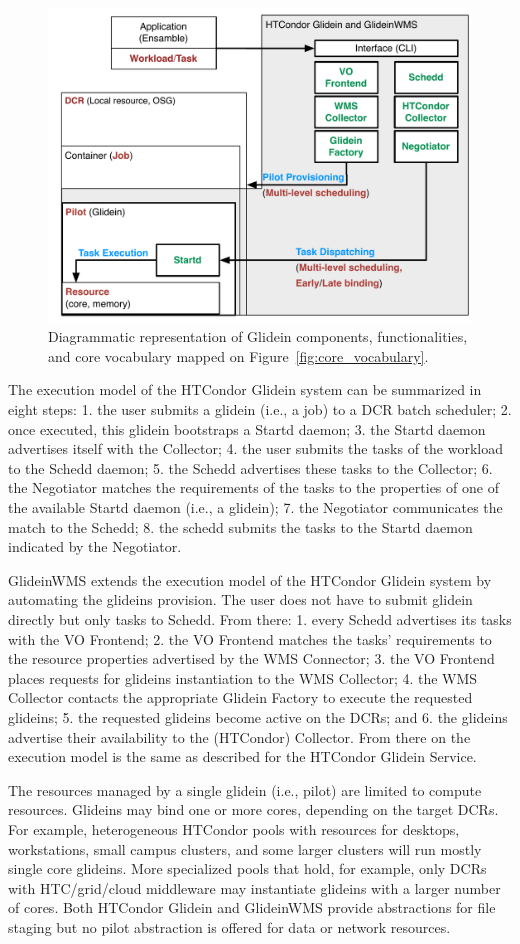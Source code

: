 \documentclass{sig-alternate}
\begin{document}
\begin{figure}[t]
    \centering
        \includegraphics[width=.48\textwidth]{figures/glidein_comparison.pdf}
        \caption{Diagrammatic representation of Glidein components,
          functionalities, and core vocabulary mapped on
          Figure~\ref{fig:core_vocabulary}.}
    \label{fig:glidein_comparison}
\end{figure}

The execution model of the HTCondor Glidein system can be summarized in eight
steps: 1. the user submits a glidein (i.e., a job) to a DCR batch scheduler; 2.
once executed, this glidein bootstraps a Startd daemon; 3. the Startd daemon
advertises itself with the Collector; 4. the user submits the tasks of the
workload to the Schedd daemon; 5. the Schedd advertises these tasks to the
Collector; 6. the Negotiator matches the requirements of the tasks to the
properties of one of the available Startd daemon (i.e., a glidein); 7. the
Negotiator communicates the match to the Schedd; 8. the schedd submits the tasks
to the Startd daemon indicated by the Negotiator.

GlideinWMS extends the execution model of the HTCondor Glidein system by
automating the glideins provision. The user does not have to submit glidein
directly but only tasks to Schedd. From there: 1. every Schedd advertises its
tasks with the VO Frontend; 2. the VO Frontend matches the tasks' requirements
to the resource properties advertised by the WMS Connector; 3. the VO Frontend
places requests for glideins instantiation to the WMS Collector; 4. the WMS
Collector contacts the appropriate Glidein Factory to execute the requested
glideins; 5. the requested glideins become active on the DCRs; and 6. the
glideins advertise their availability to the (HTCondor) Collector. From there on
the execution model is the same as described for the HTCondor Glidein Service.


The resources managed by a single glidein (i.e., pilot) are limited to compute
resources. Glideins may bind one or more cores, depending on the target DCRs.
For example, heterogeneous HTCondor pools with resources for desktops,
workstations, small campus clusters, and some larger clusters will run mostly
single core glideins. More specialized pools that hold, for example, only DCRs
with HTC/grid/cloud middleware may instantiate glideins with a larger number of
cores. Both HTCondor Glidein and GlideinWMS provide abstractions for file
staging but no pilot abstraction is offered for data or network resources.
\end{document}
